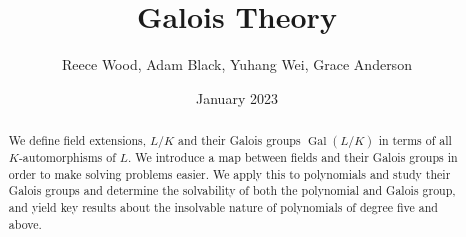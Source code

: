 \documentclass{uonmath-mgp}
\title{\textbf{Galois Theory}}
\author{Reece Wood, Adam Black, Yuhang Wei, Grace Anderson}
\date{January 2023}
\theoremstyle{definition}
\newcommand{\Gal}{\operatorname{Gal}}
\begin{document}
\begin{abstract}
    We define field extensions, $L/K$ and their Galois groups $\Gal(L/K)$ in terms of all $K$-automorphisms of $L$. We introduce a map between fields and their Galois groups in order to make solving problems easier. We apply this to polynomials and study their Galois groups and determine the solvability of both the polynomial and Galois group, and yield key results about the insolvable nature of polynomials of degree five and above.
\end{abstract}

\maketitle



\newpage 


\tableofcontents



\newpage
\setcounter{page}{1}










\newpage
\appendix



\newpage
% 

\end{document}
